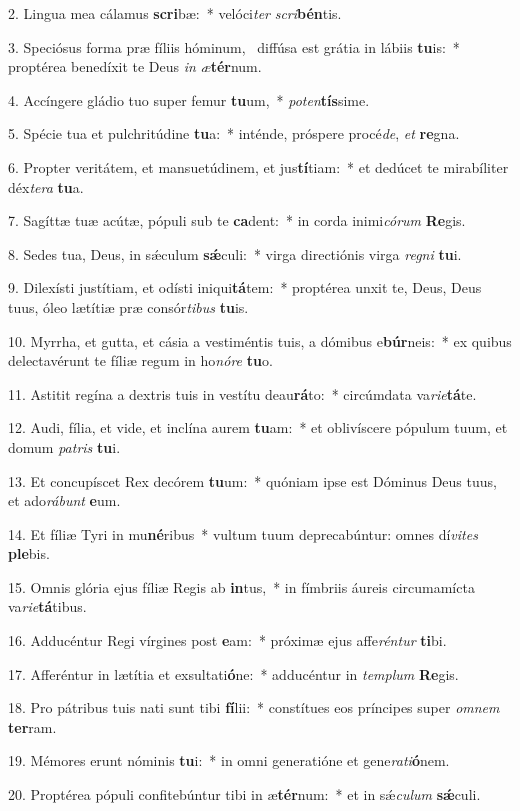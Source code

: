 2. Lingua mea cálamus \textbf{scri}bæ:~*  velóci\textit{ter} \textit{scri}\textbf{bén}tis.\

3. Speciósus forma præ fíliis hóminum, \dag\  diffúsa est grátia in lábiis \textbf{tu}is:~*  proptérea benedíxit te Deus \textit{in} \textit{æ}\textbf{tér}num.\

4. Accíngere gládio tuo super femur \textbf{tu}um,~*  \textit{pot}\textit{en}\textbf{tís}sime.\

5. Spécie tua et pulchritúdine \textbf{tu}a:~*  inténde, próspere procé\textit{de}, \textit{et} \textbf{re}gna.\

6. Propter veritátem, et mansuetúdinem, et jus\textbf{tí}tiam:~*  et dedúcet te mirabíliter déx\textit{te}\textit{ra} \textbf{tu}a.\

7. Sagíttæ tuæ acútæ, pópuli sub te \textbf{ca}dent:~*  in corda inimi\textit{có}\textit{rum} \textbf{Re}gis.\

8. Sedes tua, Deus, in sǽculum \textbf{sǽ}culi:~*  virga directiónis virga \textit{re}\textit{gni} \textbf{tu}i.\

9. Dilexísti justítiam, et odísti iniqui\textbf{tá}tem:~*  proptérea unxit te, Deus, Deus tuus, óleo lætítiæ præ consór\textit{ti}\textit{bus} \textbf{tu}is.\

10. Myrrha, et gutta, et cásia a vestiméntis tuis, a dómibus e\textbf{búr}neis:~*  ex quibus delectavérunt te fíliæ regum in ho\textit{nó}\textit{re} \textbf{tu}o.\

11. Astitit regína a dextris tuis in vestítu deau\textbf{rá}to:~*  circúmdata va\textit{ri}\textit{e}\textbf{tá}te.\

12. Audi, fília, et vide, et inclína aurem \textbf{tu}am:~*  et oblivíscere pópulum tuum, et domum \textit{pa}\textit{tris} \textbf{tu}i.\

13. Et concupíscet Rex decórem \textbf{tu}um:~*  quóniam ipse est Dóminus Deus tuus, et ado\textit{rá}\textit{bunt} \textbf{e}um.\

14. Et fíliæ Tyri in mu\textbf{né}ribus~*  vultum tuum deprecabúntur: omnes dí\textit{vi}\textit{tes} \textbf{ple}bis.\

15. Omnis glória ejus fíliæ Regis ab \textbf{in}tus,~*  in fímbriis áureis circumamícta va\textit{ri}\textit{e}\textbf{tá}tibus.\

16. Adducéntur Regi vírgines post \textbf{e}am:~*  próximæ ejus affe\textit{rén}\textit{tur} \textbf{ti}bi.\

17. Afferéntur in lætítia et exsultati\textbf{ó}ne:~*  adducéntur in \textit{tem}\textit{plum} \textbf{Re}gis.\

18. Pro pátribus tuis nati sunt tibi \textbf{fí}lii:~*  constítues eos príncipes super \textit{om}\textit{nem} \textbf{ter}ram.\

19. Mémores erunt nóminis \textbf{tu}i:~*  in omni generatióne et gene\textit{ra}\textit{ti}\textbf{ó}nem.\

20. Proptérea pópuli confitebúntur tibi in æ\textbf{tér}num:~*  et in sǽ\textit{cu}\textit{lum} \textbf{sǽ}culi.\

